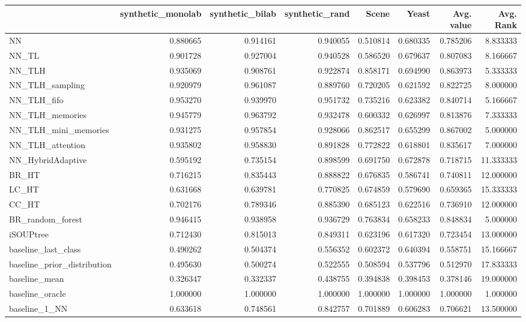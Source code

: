 \begin{tabular}{lrrrrrrr}
\toprule
 & synthetic_monolab & synthetic_bilab & synthetic_rand & Scene & Yeast & Avg. value & Avg. Rank \\
\midrule
NN & 0.880665 & 0.914161 & 0.940055 & 0.510814 & 0.680335 & 0.785206 & 8.833333 \\
NN_TL & 0.901728 & 0.927004 & 0.940528 & 0.586520 & 0.679637 & 0.807083 & 8.166667 \\
NN_TLH & 0.935069 & 0.908761 & 0.922874 & 0.858171 & 0.694990 & 0.863973 & 5.333333 \\
NN_TLH_sampling & 0.920979 & 0.961087 & 0.889760 & 0.720205 & 0.621592 & 0.822725 & 8.000000 \\
NN_TLH_fifo & 0.953270 & 0.939970 & 0.951732 & 0.735216 & 0.623382 & 0.840714 & 5.166667 \\
NN_TLH_memories & 0.945779 & 0.963792 & 0.932478 & 0.600332 & 0.626997 & 0.813876 & 7.333333 \\
NN_TLH_mini_memories & 0.931275 & 0.957854 & 0.928066 & 0.862517 & 0.655299 & 0.867002 & 5.000000 \\
NN_TLH_attention & 0.935802 & 0.958830 & 0.891828 & 0.772822 & 0.618801 & 0.835617 & 7.000000 \\
NN_HybridAdaptive & 0.595192 & 0.735154 & 0.898599 & 0.691750 & 0.672878 & 0.718715 & 11.333333 \\
BR_HT & 0.716215 & 0.835443 & 0.888822 & 0.676835 & 0.586741 & 0.740811 & 12.000000 \\
LC_HT & 0.631668 & 0.639781 & 0.770825 & 0.674859 & 0.579690 & 0.659365 & 15.333333 \\
CC_HT & 0.702176 & 0.789346 & 0.885390 & 0.685123 & 0.622516 & 0.736910 & 12.000000 \\
BR_random_forest & 0.946415 & 0.938958 & 0.936729 & 0.763834 & 0.658233 & 0.848834 & 5.000000 \\
iSOUPtree & 0.712430 & 0.815013 & 0.849311 & 0.623196 & 0.617320 & 0.723454 & 13.000000 \\
baseline_last_class & 0.490262 & 0.504374 & 0.556352 & 0.602372 & 0.640394 & 0.558751 & 15.166667 \\
baseline_prior_distribution & 0.495630 & 0.500274 & 0.522555 & 0.508594 & 0.537796 & 0.512970 & 17.833333 \\
baseline_mean & 0.326347 & 0.332337 & 0.438755 & 0.394838 & 0.398453 & 0.378146 & 19.000000 \\
baseline_oracle & 1.000000 & 1.000000 & 1.000000 & 1.000000 & 1.000000 & 1.000000 & 1.000000 \\
baseline_1_NN & 0.633618 & 0.748561 & 0.842757 & 0.701889 & 0.606283 & 0.706621 & 13.500000 \\
\bottomrule
\end{tabular}
